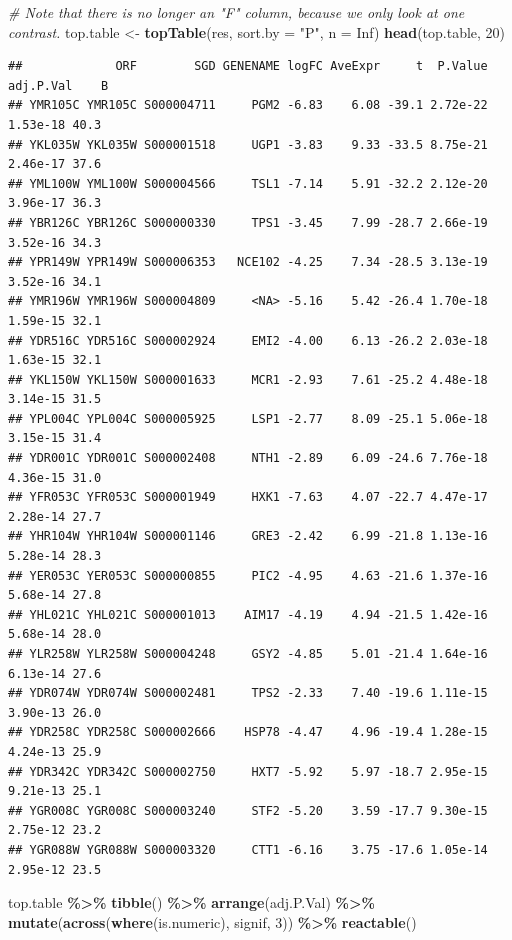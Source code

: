 \documentclass[
]{book}
\newenvironment{Shaded}{\begin{snugshade}}{\end{snugshade}}
\newcommand{\AttributeTok}[1]{\textcolor[rgb]{0.13,0.29,0.53}{#1}}
\newcommand{\CommentTok}[1]{\textcolor[rgb]{0.56,0.35,0.01}{\textit{#1}}}
\newcommand{\ConstantTok}[1]{\textcolor[rgb]{0.56,0.35,0.01}{#1}}
\newcommand{\DecValTok}[1]{\textcolor[rgb]{0.00,0.00,0.81}{#1}}
\newcommand{\FunctionTok}[1]{\textcolor[rgb]{0.13,0.29,0.53}{\textbf{#1}}}
\newcommand{\NormalTok}[1]{#1}
\newcommand{\OtherTok}[1]{\textcolor[rgb]{0.56,0.35,0.01}{#1}}
\newcommand{\SpecialCharTok}[1]{\textcolor[rgb]{0.81,0.36,0.00}{\textbf{#1}}}
\newcommand{\StringTok}[1]{\textcolor[rgb]{0.31,0.60,0.02}{#1}}
\begin{document}
\begin{Shaded}
\begin{Highlighting}[]
\CommentTok{\# Note that there is no longer an "F" column, because we only look at one contrast.}
\NormalTok{top.table }\OtherTok{\textless{}{-}} \FunctionTok{topTable}\NormalTok{(res, }\AttributeTok{sort.by =} \StringTok{"P"}\NormalTok{, }\AttributeTok{n =} \ConstantTok{Inf}\NormalTok{)}
\FunctionTok{head}\NormalTok{(top.table, }\DecValTok{20}\NormalTok{)}
\end{Highlighting}
\end{Shaded}

\begin{verbatim}
##             ORF        SGD GENENAME logFC AveExpr     t  P.Value adj.P.Val    B
## YMR105C YMR105C S000004711     PGM2 -6.83    6.08 -39.1 2.72e-22  1.53e-18 40.3
## YKL035W YKL035W S000001518     UGP1 -3.83    9.33 -33.5 8.75e-21  2.46e-17 37.6
## YML100W YML100W S000004566     TSL1 -7.14    5.91 -32.2 2.12e-20  3.96e-17 36.3
## YBR126C YBR126C S000000330     TPS1 -3.45    7.99 -28.7 2.66e-19  3.52e-16 34.3
## YPR149W YPR149W S000006353   NCE102 -4.25    7.34 -28.5 3.13e-19  3.52e-16 34.1
## YMR196W YMR196W S000004809     <NA> -5.16    5.42 -26.4 1.70e-18  1.59e-15 32.1
## YDR516C YDR516C S000002924     EMI2 -4.00    6.13 -26.2 2.03e-18  1.63e-15 32.1
## YKL150W YKL150W S000001633     MCR1 -2.93    7.61 -25.2 4.48e-18  3.14e-15 31.5
## YPL004C YPL004C S000005925     LSP1 -2.77    8.09 -25.1 5.06e-18  3.15e-15 31.4
## YDR001C YDR001C S000002408     NTH1 -2.89    6.09 -24.6 7.76e-18  4.36e-15 31.0
## YFR053C YFR053C S000001949     HXK1 -7.63    4.07 -22.7 4.47e-17  2.28e-14 27.7
## YHR104W YHR104W S000001146     GRE3 -2.42    6.99 -21.8 1.13e-16  5.28e-14 28.3
## YER053C YER053C S000000855     PIC2 -4.95    4.63 -21.6 1.37e-16  5.68e-14 27.8
## YHL021C YHL021C S000001013    AIM17 -4.19    4.94 -21.5 1.42e-16  5.68e-14 28.0
## YLR258W YLR258W S000004248     GSY2 -4.85    5.01 -21.4 1.64e-16  6.13e-14 27.6
## YDR074W YDR074W S000002481     TPS2 -2.33    7.40 -19.6 1.11e-15  3.90e-13 26.0
## YDR258C YDR258C S000002666    HSP78 -4.47    4.96 -19.4 1.28e-15  4.24e-13 25.9
## YDR342C YDR342C S000002750     HXT7 -5.92    5.97 -18.7 2.95e-15  9.21e-13 25.1
## YGR008C YGR008C S000003240     STF2 -5.20    3.59 -17.7 9.30e-15  2.75e-12 23.2
## YGR088W YGR088W S000003320     CTT1 -6.16    3.75 -17.6 1.05e-14  2.95e-12 23.5
\end{verbatim}

\begin{Shaded}
\begin{Highlighting}[]
\NormalTok{top.table }\SpecialCharTok{\%\textgreater{}\%} 
  \FunctionTok{tibble}\NormalTok{() }\SpecialCharTok{\%\textgreater{}\%} 
  \FunctionTok{arrange}\NormalTok{(adj.P.Val) }\SpecialCharTok{\%\textgreater{}\%}
  \FunctionTok{mutate}\NormalTok{(}\FunctionTok{across}\NormalTok{(}\FunctionTok{where}\NormalTok{(is.numeric), signif, }\DecValTok{3}\NormalTok{)) }\SpecialCharTok{\%\textgreater{}\%}
  \FunctionTok{reactable}\NormalTok{()}
\end{Highlighting}
\end{Shaded}
\end{document}
